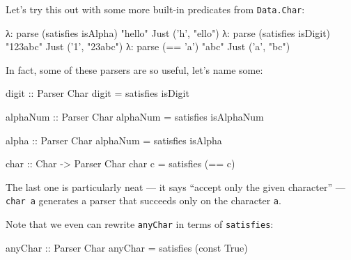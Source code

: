 \documentclass[]{article}
\newenvironment{Shaded}{}{}
\newcommand{\CharTok}[1]{\textcolor[rgb]{0.25,0.44,0.63}{#1}}
\newcommand{\DataTypeTok}[1]{\textcolor[rgb]{0.56,0.13,0.00}{#1}}
\newcommand{\FunctionTok}[1]{\textcolor[rgb]{0.02,0.16,0.49}{#1}}
\newcommand{\NormalTok}[1]{#1}
\newcommand{\OtherTok}[1]{\textcolor[rgb]{0.00,0.44,0.13}{#1}}
\newcommand{\StringTok}[1]{\textcolor[rgb]{0.25,0.44,0.63}{#1}}
\begin{document}
Let's try this out with some more built-in predicates from \texttt{Data.Char}:

\begin{Shaded}
\begin{Highlighting}[]
\NormalTok{λ}\FunctionTok{:}\NormalTok{ parse (satisfies isAlpha) }\StringTok{"hello"}
\DataTypeTok{Just}\NormalTok{ (}\CharTok{'h'}\NormalTok{, }\StringTok{"ello"}\NormalTok{)}
\NormalTok{λ}\FunctionTok{:}\NormalTok{ parse (satisfies isDigit) }\StringTok{"123abc"}
\DataTypeTok{Just}\NormalTok{ (}\CharTok{'1'}\NormalTok{, }\StringTok{"23abc"}\NormalTok{)}
\NormalTok{λ}\FunctionTok{:}\NormalTok{ parse (}\FunctionTok{==} \CharTok{'a'}\NormalTok{) }\StringTok{"abc"}
\DataTypeTok{Just}\NormalTok{ (}\CharTok{'a'}\NormalTok{, }\StringTok{"bc"}\NormalTok{)}
\end{Highlighting}
\end{Shaded}

In fact, some of these parsers are so useful, let's name some:

\begin{Shaded}
\begin{Highlighting}[]
\OtherTok{digit ::} \DataTypeTok{Parser} \DataTypeTok{Char}
\NormalTok{digit }\FunctionTok{=}\NormalTok{ satisfies isDigit}

\OtherTok{alphaNum ::} \DataTypeTok{Parser} \DataTypeTok{Char}
\NormalTok{alphaNum }\FunctionTok{=}\NormalTok{ satisfies isAlphaNum}

\OtherTok{alpha ::} \DataTypeTok{Parser} \DataTypeTok{Char}
\NormalTok{alphaNum }\FunctionTok{=}\NormalTok{ satisfies isAlpha}

\OtherTok{char ::} \DataTypeTok{Char} \OtherTok{->} \DataTypeTok{Parser} \DataTypeTok{Char}
\NormalTok{char c }\FunctionTok{=}\NormalTok{ satisfies (}\FunctionTok{==}\NormalTok{ c)}
\end{Highlighting}
\end{Shaded}

The last one is particularly neat --- it says ``accept only the given
character'' --- \texttt{char\ \textquotesingle{}a\textquotesingle{}} generates a
parser that succeeds only on the character \texttt{a}.

Note that we even can rewrite \texttt{anyChar} in terms of \texttt{satisfies}:

\begin{Shaded}
\begin{Highlighting}[]
\OtherTok{anyChar ::} \DataTypeTok{Parser} \DataTypeTok{Char}
\NormalTok{anyChar }\FunctionTok{=}\NormalTok{ satisfies (const }\DataTypeTok{True}\NormalTok{)}
\end{Highlighting}
\end{Shaded}
\end{document}
